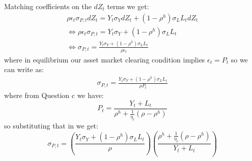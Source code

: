 \documentclass{article}
\begin{document}
    Matching coefficients on the $dZ_t$ terms we get:
    \[
    \begin{aligned}
        \rho \epsilon_t \sigma_{P, t} d Z_t = Y_t \sigma_Y d Z_t + (1 - \rho^h) \sigma_L L_t d Z_t\\
        \iff \rho \epsilon_t \sigma_{P, t}  = Y_t \sigma_Y + (1 - \rho^h) \sigma_L L_t \\
        \iff \sigma_{P, t} = \frac{Y_t \sigma_Y + (1 - \rho^h) \sigma_L L_t}{\rho \epsilon_t}
    \end{aligned}    
    \]
    where in equilibrium our asset market clearing condition implies $\epsilon_t = P_t$ so we can write as:
    \[
        \begin{aligned}
            \sigma_{P, t} = \frac{Y_t \sigma_Y + (1 - \rho^h) \sigma_L L_t}{\rho P_t}%
        \end{aligned}   
    \]
    where from Question c we have:
    \[
        P_t = \frac{Y_{t} + L_t}{\rho^h + \frac{1}{\eta_t}(\rho-\rho^h)}
    \]
    so substituting that in we get:
    \[
        \boxed{\sigma_{P, t} = \left(\frac{Y_t \sigma_Y + (1 - \rho^h) \sigma_L L_t}{\rho}\right) \left(\frac{\rho^h + \frac{1}{\eta_t}(\rho-\rho^h)}{Y_{t} + L_t} \right)}
    \]

\end{document}
